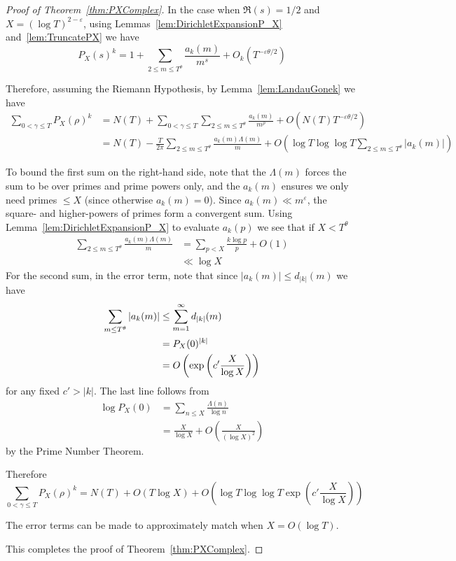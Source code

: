 \documentclass[12pt,a4paper,reqno]{amsart}
\theoremstyle{remark}
\numberwithin{equation}{section}
\begin{document}
\begin{proof}[Proof of Theorem~\ref{thm:PXComplex}]
In the case when $\Re(s)=1/2$ and $X=(\log T)^{2-\varepsilon}$, using Lemmas~\ref{lem:DirichletExpansionP_X} and~\ref{lem:TruncatePX} we have
\[
P_X(s)^k = 1 +  \sum_{2 \leq m \leq T^{\theta}} \frac{a_k(m)}{m^{s}} + O_k\left(T^{-\varepsilon \theta / 2}\right)
\]

Therefore, assuming the Riemann Hypothesis, by  Lemma~\ref{lem:LandauGonek} we have
\begin{align*}
\sum_{0<\gamma\leq T} P_X(\rho)^k &= N(T) + \sum_{0<\gamma \leq T} \sum_{2\leq m\leq T^\theta} \frac{a_k(m)}{m^\rho} + O\left(N(T) T^{-\varepsilon \theta / 2}\right) \\
&= N(T) - \frac{T}{2 \pi} \sum_{2\leq m \leq T^\theta} \frac{ a_k(m) \Lambda (m)}{m} +  O\left(\log T \log\log T \sum_{2\leq m \leq T^\theta} |a_k(m)| \right)
\end{align*}


To bound the first sum on the right-hand side, note that the $\Lambda(m)$ forces the sum to be over primes and prime powers only, and the $a_k(m)$ ensures we only need primes $\leq X$ (since otherwise $a_k(m)=0$). Since $a_k(m) \ll m^\varepsilon$, the square- and higher-powers of primes form a convergent sum. Using Lemma~\ref{lem:DirichletExpansionP_X}  to evaluate $a_k(p)$ we see that if $X < T^{\theta}$
\begin{align*}
\sum_{2\leq m \leq T^\theta} \frac{ a_k(m) \Lambda (m)}{m} &= \sum_{p < X} \frac{ k \log p}{p} + O(1) \\
&\ll \log X
\end{align*}
For the second sum, in the error term, note that since $|a_k(m)| \leq d_{|k|}(m)$ we have
\begin{align}
\sum_{m\leq T^\theta} |a_k(m)| &\leq \sum_{m=1}^\infty d_{|k|}(m) \notag\\
&= P_X(0)^{|k|} \notag\\
&=O \left( \exp\left(c' \frac{X }{\log X} \right) \right) \label{eq:P_X(0)^k}
\end{align}
for any fixed $c'>|k|$. The last line follows from
\begin{align*}
\log P_X(0) &= \sum_{n\leq X}  \frac{\Lambda(n)  }{\log n} \\
&= \frac{X}{\log X} + O\left(\frac{X}{(\log X)^2}\right)
\end{align*}
by the Prime Number Theorem.

Therefore
\[
\sum_{0<\gamma\leq T} P_X(\rho)^k = N(T) + O\left(T \log X\right) + O\left(\log T \log\log T \exp\left(c' \frac{X }{\log X} \right)  \right)
\]

The error terms can be made to approximately match when $X=O(\log T)$.

This completes the proof of Theorem~\ref{thm:PXComplex}.
\end{proof}
\end{document}
